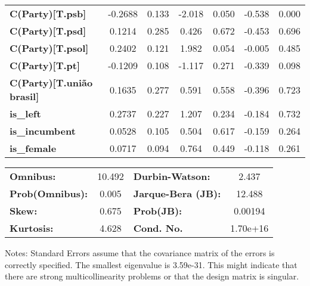 \begin{center}
\begin{tabular}{lcccccc}
\textbf{C(Party)[T.psb]}           &      -0.2688  &        0.133     &    -2.018  &         0.050        &       -0.538    &        0.000     \\
\textbf{C(Party)[T.psd]}           &       0.1214  &        0.285     &     0.426  &         0.672        &       -0.453    &        0.696     \\
\textbf{C(Party)[T.psol]}          &       0.2402  &        0.121     &     1.982  &         0.054        &       -0.005    &        0.485     \\
\textbf{C(Party)[T.pt]}            &      -0.1209  &        0.108     &    -1.117  &         0.271        &       -0.339    &        0.098     \\
\textbf{C(Party)[T.união brasil]}  &       0.1635  &        0.277     &     0.591  &         0.558        &       -0.396    &        0.723     \\
\textbf{is\_left}                  &       0.2737  &        0.227     &     1.207  &         0.234        &       -0.184    &        0.732     \\
\textbf{is\_incumbent}             &       0.0528  &        0.105     &     0.504  &         0.617        &       -0.159    &        0.264     \\
\textbf{is\_female}                &       0.0717  &        0.094     &     0.764  &         0.449        &       -0.118    &        0.261     \\
\bottomrule
\end{tabular}
\begin{tabular}{lclc}
\textbf{Omnibus:}       & 10.492 & \textbf{  Durbin-Watson:     } &    2.437  \\
\textbf{Prob(Omnibus):} &  0.005 & \textbf{  Jarque-Bera (JB):  } &   12.488  \\
\textbf{Skew:}          &  0.675 & \textbf{  Prob(JB):          } &  0.00194  \\
\textbf{Kurtosis:}      &  4.628 & \textbf{  Cond. No.          } & 1.70e+16  \\
\bottomrule
\end{tabular}
\end{center}

Notes: \newline
 [1] Standard Errors assume that the covariance matrix of the errors is correctly specified. \newline
 [2] The smallest eigenvalue is 3.59e-31. This might indicate that there are \newline
 strong multicollinearity problems or that the design matrix is singular.